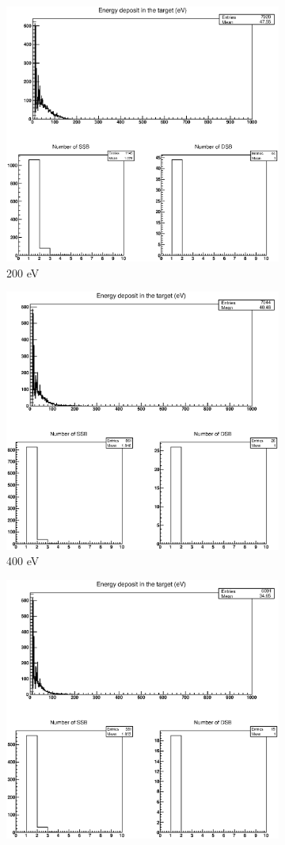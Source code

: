 \begin{figure}
\begin{subfigure}{.5\textwidth}
  \includegraphics[width=.78\linewidth]{./Figures/2.eps}
  \caption{200 eV}
  \label{fig:sube3}
\end{subfigure}%
\begin{subfigure}{.5\textwidth}
  \centering
  \includegraphics[width=.78\linewidth]{./Figures/3.eps}
  \caption{400 eV}
  \label{fig:sube4}
\end{subfigure}
\begin{subfigure}{.5\textwidth}
  \centering
  \includegraphics[width=.78\linewidth]{./Figures/4.eps}

\end{subfigure}
\end{figure}
